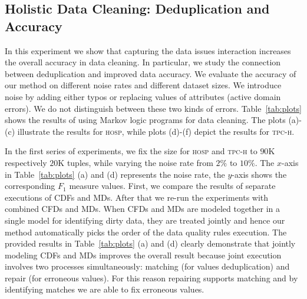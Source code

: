 \subsection{Holistic Data Cleaning: Deduplication and Accuracy}
\label{subsec:exp1}
In this experiment we show that capturing the data issues interaction increases the overall accuracy in data cleaning. In particular, we study the connection between deduplication and improved data accuracy. We evaluate the accuracy of our method on different noise rates and different dataset sizes. We introduce noise by adding either typos or replacing values of attributes (active domain errors). We do not distinguish between these two kinds of errors. Table~\ref{tab:plots} shows the results of using Markov logic programs for data cleaning. The plots (a)-(c) illustrate the results for \textsc{hosp}, while plots (d)-(f) depict the results for \textsc{tpc-h}. %

In the first series of experiments, we fix the size for \textsc{hosp} and \textsc{tpc-h} to $90$K respectively $20$K tuples, while varying the noise rate from $2\%$ to $10\%$. The $x$-axis in Table~\ref{tab:plots} (a) and (d) represents the noise rate, the $y$-axis shows the corresponding $F_1$ measure values. First, we compare the results of separate executions of CDFs and MDs. After that we re-run the experiments with combined CFDs and MDs. When CFDs and MDs are modeled together in a single model for identifying dirty data, they are treated jointly and hence our method automatically picks the order of the data quality rules execution. The provided results in Table~\ref{tab:plots} (a) and (d) clearly demonstrate that jointly modeling CDFs and MDs improves the overall result because joint execution involves two processes simultaneously: matching (for values deduplication) and repair (for erroneous values). For this reason repairing supports matching and by identifying matches we are able to fix erroneous values.

